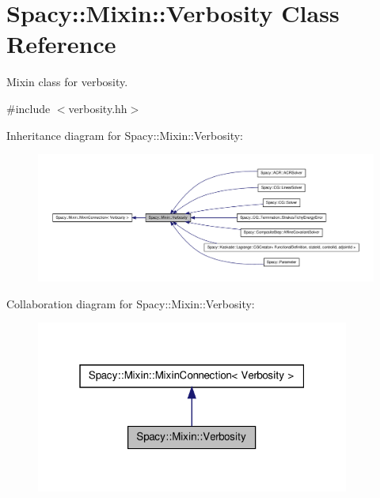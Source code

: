 \hypertarget{classSpacy_1_1Mixin_1_1Verbosity}{\section{\-Spacy\-:\-:\-Mixin\-:\-:\-Verbosity \-Class \-Reference}
\label{classSpacy_1_1Mixin_1_1Verbosity}
}


\-Mixin class for verbosity.  




{\ttfamily \#include $<$verbosity.\-hh$>$}



\-Inheritance diagram for \-Spacy\-:\-:\-Mixin\-:\-:\-Verbosity\-:
\nopagebreak
\begin{figure}[H]
\begin{center}
\leavevmode
\includegraphics[width=350pt]{classSpacy_1_1Mixin_1_1Verbosity__inherit__graph}
\end{center}
\end{figure}


\-Collaboration diagram for \-Spacy\-:\-:\-Mixin\-:\-:\-Verbosity\-:
\nopagebreak
\begin{figure}[H]
\begin{center}
\leavevmode
\includegraphics[width=292pt]{classSpacy_1_1Mixin_1_1Verbosity__coll__graph}
\end{center}
\end{figure}
